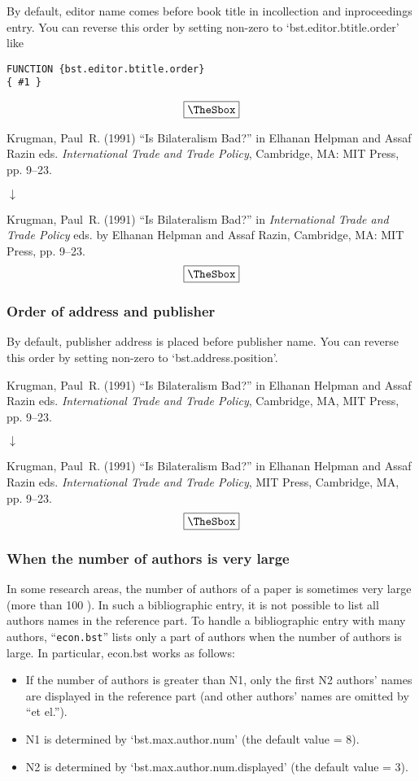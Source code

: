 \documentclass[10pt]{article}
\newenvironment{Frame}%
{\setlength{\fboxsep}{15pt}
\setlength{\mylength}{\linewidth}%
\addtolength{\mylength}{-2\fboxsep}%
\addtolength{\mylength}{-2\fboxrule}%
\Sbox
\minipage{\mylength}%
\setlength{\abovedisplayskip}{0pt}%
\setlength{\belowdisplayskip}{0pt}%
}%
{\endminipage\endSbox
\[\fbox{\TheSbox}\]}
\begin{document}
By default, editor name comes before book title in incollection and
inproceedings entry. You can reverse this order by
setting non-zero to `bst.editor.btitle.order' like
\begin{Frame}
\begin{verbatim}
FUNCTION {bst.editor.btitle.order}
{ #1 }
\end{verbatim}
\end{Frame}


\begin{Frame}
Krugman, Paul~R. (1991) ``Is Bilateralism Bad?'' in Elhanan Helpman and Assaf
  Razin eds.  {\it International Trade and Trade Policy}, Cambridge, MA: MIT
  Press, pp. 9--23.
\begin{center}
 $\downarrow$
\end{center} 
Krugman, Paul~R. (1991) ``Is Bilateralism Bad?'' in  {\it International Trade
and Trade Policy}  eds. by Elhanan Helpman and Assaf Razin, Cambridge, MA:
MIT Press, pp. 9--23.
\end{Frame}

\subsubsection{Order of address and publisher}

By default, publisher address is placed before publisher name.  You can
reverse this order by setting non-zero to `bst.address.position'.
\begin{Frame}
Krugman, Paul~R. (1991) ``Is Bilateralism Bad?'' in Elhanan Helpman and
  Assaf Razin eds.  {\it International Trade and Trade Policy},
  Cambridge, MA, MIT Press, pp. 9--23.
\begin{center}
 $\downarrow$
\end{center} 
Krugman, Paul~R. (1991) ``Is Bilateralism Bad?'' in Elhanan Helpman and Assaf
  Razin eds.   {\it International Trade and Trade Policy}, MIT Press,
  Cambridge, MA, pp. 9--23.
\end{Frame}

\subsubsection{When the number of authors is very large}

In some research areas, the number of authors of a paper is sometimes very large
(more than 100 ). In such a bibliographic entry, it is not possible to list all
authors names in the reference part.  To handle a bibliographic entry with many
authors, ``\texttt{econ.bst}'' lists only a part of authors when the number of
authors is large. In particular, econ.bst works as follows:
\begin{itemize}
 \item If the number of authors is greater than N1, only the first N2 authors'
       names are displayed in the reference part (and other authors' names are
       omitted by ``et el.'').
 \item N1 is determined by `bst.max.author.num' (the default value = 8).
 \item N2 is determined by `bst.max.author.num.displayed' (the default value =
       3).
\end{itemize}
\end{document}

